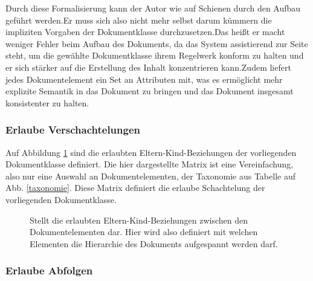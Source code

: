  
Durch diese Formalisierung kann der Autor wie auf Schienen durch den Aufbau geführt werden.Er muss sich also nicht mehr selbst darum kümmern die impliziten Vorgaben der Dokumentklasse durchzusetzen.Das heißt er macht weniger Fehler beim Aufbau des Dokuments, da das System assistierend zur Seite steht, um die gewählte Dokumentklasse ihrem Regelwerk konform zu halten und er sich stärker auf die Erstellung des Inhalt konzentrieren kann.Zudem liefert jedes Dokumentelement ein Set an Attributen mit, was es ermöglicht mehr explizite Semantik in das Dokument zu bringen und das Dokument insgesamt konsistenter zu halten.

 
\subsubsection{Erlaube Verschachtelungen}\label{}

 
Auf Abbildung \ref{matrixkind} sind die erlaubten Eltern-Kind-Beziehungen der vorliegenden Dokumentklasse definiert. Die hier dargestellte Matrix ist eine Vereinfachung, also nur eine Auswahl an Dokumentelementen, der Taxonomie aus Tabelle auf Abb. \ref{taxonomie}. Diese Matrix definiert die erlaube Schachtelung der vorliegenden Dokumentklasse.

 
\begin{figure}[h!]
\centering
\advance\leftskip-2.5cm
\caption{ Stellt die erlaubten Eltern-Kind-Beziehungen zwischen den Dokumentelementen dar. Hier wird also definiert mit welchen Elementen die Hierarchie des Dokuments aufgespannt werden darf. }\label{matrixkind}
\end{figure}
 
\subsubsection{Erlaube Abfolgen}\label{}

